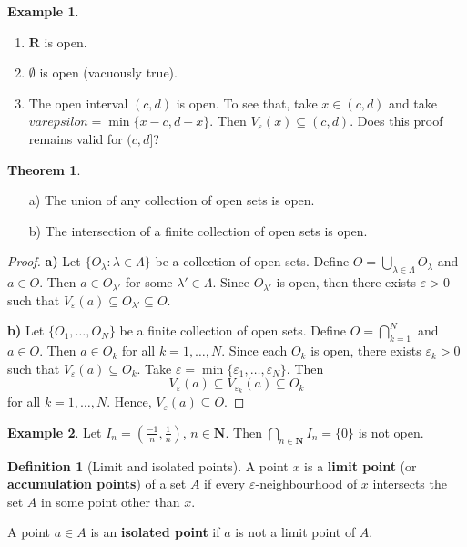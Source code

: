 \documentclass[tikz,12pt,a4paper]{article}
\theoremstyle{definition}
\newtheorem{theorem}{Theorem}[section]
\newtheorem{example}{Example}[section]
\newtheorem{definition}{Definition}[section]
\begin{document}
\begin{example}
	\begin{enumerate} \hfill
		\item $\textbf{R}$ is open.
		\item $\emptyset$ is open (vacuously true).
		\item The open interval $(c, d)$ is open. To see that, take $x \in (c,d)$ and take $varepsilon = \min \{ x-c, d-x \}$. Then $V_{\varepsilon}(x) \subseteq (c,d)$. Does this proof remains valid for $(c,d]$?
	\end{enumerate}
\end{example}

\begin{theorem}\label{union-inter-open}
	\begin{itemize} \hfill
		\item[a)] The union of any collection of open sets is open.
		\item[b)] The intersection of a finite collection of open sets is open.
	\end{itemize}
\end{theorem}

\begin{proof}
	\textbf{a)} Let $\{ O_\lambda : \lambda \in \Lambda \}$ be a collection of open sets. Define $O = \bigcup_{\lambda \in \Lambda} O_\lambda$ and $a \in O$. Then $a \in O_{\lambda'}$ for some $\lambda' \in \Lambda$. Since $O_{\lambda'}$ is open, then there exists $\varepsilon > 0$ such that $V_\varepsilon(a) \subseteq O_{\lambda'} \subseteq O$.
	
	\textbf{b)} Let $\{ O_1, \ldots, O_N\}$ be a finite collection of open sets. Define $O = \bigcap_{k=1}^N$ and $a \in O$. Then $a \in O_k$ for all $k = 1, \ldots, N$. Since each $O_k$ is open, there exists $\varepsilon_k > 0$ such that $V_\varepsilon(a) \subseteq O_k$. Take $\varepsilon = \min \{ \varepsilon_1, \ldots, \varepsilon_N \}$. Then
	\[
		V_\varepsilon(a) \subseteq V_{\varepsilon_k}(a) \subseteq O_k
	\]
	for all $k = 1, \ldots, N$. Hence, $V_\varepsilon(a) \subseteq O$.
\end{proof}

\begin{example}
	Let $I_n = \left( \frac{-1}{n}, \frac{1}{n} \right)$, $n \in \textbf{N}$. Then $\bigcap_{n \in \textbf{N}} I_n = \{ 0 \}$ is not open.
\end{example}

\begin{definition}[Limit and isolated points]
	A point $x$ is a \textbf{limit point} (or \textbf{accumulation points}) of a set $A$ if every $\varepsilon$-neighbourhood of $x$ intersects the set $A$ in some point other than $x$.
	
	A point $a \in A$ is an \textbf{isolated point} if $a$ is not a limit point of $A$.
\end{definition}
\end{document}
